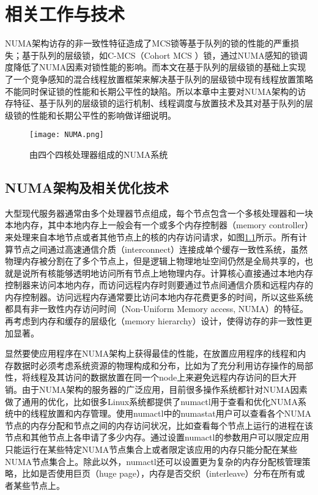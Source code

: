 
\chapter{相关工作与技术}
\label{chap:example}
NUMA架构访存的非一致性特征造成了MCS锁等基于队列的锁的性能的严重损失；基于队列的层级锁，如C-MCS（Cohort MCS ）锁，通过NUMA感知的锁调度降低了NUMA因素对锁性能的影响。而本文在基于队列的层级锁的基础上实现了一个竞争感知的混合线程放置框架来解决基于队列的层级锁中现有线程放置策略不能同时保证锁的性能和长期公平性的缺陷。所以本章中主要对NUMA架构的访存特征、基于队列的层级锁的运行机制、线程调度与放置技术及其对基于队列的层级锁的性能和长期公平性的影响做详细说明。
\begin{figure}[t]
	\centering
	\texttt{[image: NUMA.png]}
	\caption{由四个四核处理器组成的NUMA系统}
	\label{Fig:numa}
\end{figure}
\section{NUMA架构及相关优化技术}

大型现代服务器通常由多个处理器节点组成，每个节点包含一个多核处理器和一块本地内存，其中本地内存上一般会有一个或多个内存控制器（memory controller）来处理来自本地节点或者其他节点上的核的内存访问请求，如图\ref{Fig:numa}所示。所有计算节点之间通过高速通信介质（interconnect）连接成单个缓存一致性系统，虽然物理内存被分割在了多个节点上，但是逻辑上物理地址空间仍然是全局共享的，也就是说所有核能够透明地访问所有节点上地物理内存。计算核心直接通过本地内存控制器来访问本地内存，而访问远程内存时则要通过节点间通信介质和远程内存的内存控制器。访问远程内存通常要比访问本地内存花费更多的时间，所以这些系统都具有非一致性内存访问时间（Non-Uniform Memory access, NUMA）的特征。再考虑到内存和缓存的层级化（memory hierarchy）设计，使得访存的非一致性更加显著。

显然要使应用程序在NUMA架构上获得最佳的性能，在放置应用程序的线程和内存数据时必须考虑系统资源的物理构成和分布，比如为了充分利用访存操作的局部性，将线程及其访问的数据放置在同一个node上来避免远程内存访问的巨大开销。由于NUMA架构的服务器的广泛应用，目前很多操作系统都针对NUMA因素做了通用的优化，比如很多Linux系统都提供了numactl用于查看和优化NUMA系统中的线程放置和内存管理。使用numactl中的numastat用户可以查看各个NUMA节点的内存分配和节点之间的内存访问状况，比如查看每个节点上运行的进程在该节点和其他节点上各申请了多少内存。通过设置numactl的参数用户可以限定应用只能运行在某些特定NUMA节点集合上或者限定该应用的内存只能分配在某些NUMA节点集合上。除此以外，numactl还可以设置更为复杂的内存分配核管理策略，比如是否使用巨页（huge page），内存是否交织（interleave）分布在所有或者某些节点上。

